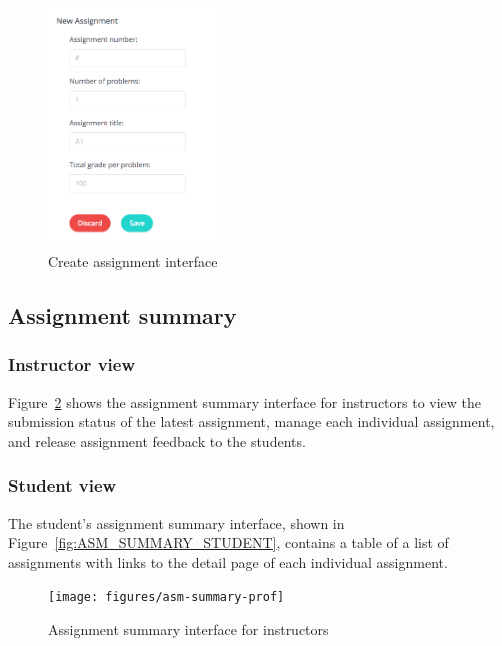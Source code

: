 \begin{figure}[H]
    \centering
        \includegraphics[width=0.4\textwidth]{figures/create-asm}
    \caption{Create assignment interface}
    \label{fig:NEW_ASM}
\end{figure}

\subsection{Assignment summary}

\subsubsection{Instructor view}
Figure~\ref{fig:ASM_SUMMARY_PROF} shows the assignment summary interface for
instructors to view the submission status of the latest assignment, manage
each individual assignment, and release assignment feedback to the students.

\subsubsection{Student view}
The student's assignment summary interface, shown in
Figure~\ref{fig:ASM_SUMMARY_STUDENT}, contains a table of a list
of assignments with links to the detail page of each individual assignment.

\begin{figure}[H]
    \centering
        \texttt{[image: figures/asm-summary-prof]}
    \caption{Assignment summary interface for instructors}
    \label{fig:ASM_SUMMARY_PROF}
\end{figure}

